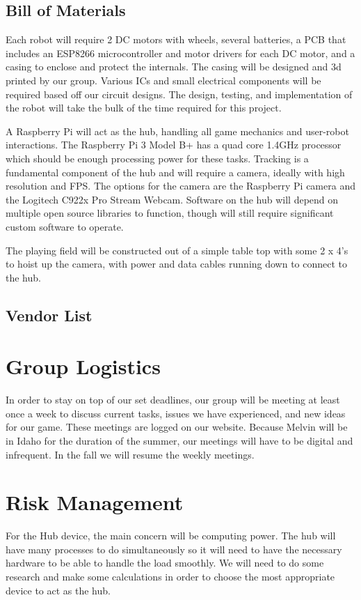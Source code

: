 \documentclass[11pt]{ieeeconf}
\begin{document}
\subsection{Bill of Materials}

Each robot will require 2 DC motors with wheels, several batteries, a PCB that includes an ESP8266 microcontroller and motor drivers for each DC motor, and a casing to enclose and protect the internals. The casing will be designed and 3d printed by our group. Various ICs and small electrical components will be required based off our circuit designs. The design, testing, and implementation of the robot will take the bulk of the time required for this project.

A Raspberry Pi will act as the hub, handling all game mechanics and user-robot interactions. The Raspberry Pi 3 Model B+ has a quad core 1.4GHz processor which should be enough processing power for these tasks. Tracking is a fundamental component of the hub and will require a camera, ideally with high resolution and FPS. The options for the camera are the Raspberry Pi camera and the Logitech C922x Pro Stream Webcam. Software on the hub will depend on multiple open source libraries to function, though will still require significant custom software to operate.

The playing field will be constructed out of a simple table top with some 2 x 4's to hoist up the camera, with power and data cables running down to connect to the hub.

\subsection{Vendor List}

\section{Group Logistics}
In order to stay on top of our set deadlines, our group will be meeting at least once a week to discuss current tasks, issues we have experienced, and new ideas for our game. These meetings are logged on our website. Because Melvin will be in Idaho for the duration of the summer, our meetings will have to be digital and infrequent. In the fall we will resume the weekly meetings.

\section{Risk Management}
For the Hub device, the main concern will be computing power. The hub will have many processes to do simultaneously so it will need to have the necessary hardware to be able to handle the load smoothly. We will need to do some research and make some calculations in order to choose the most appropriate device to act as the hub.
\end{document}
